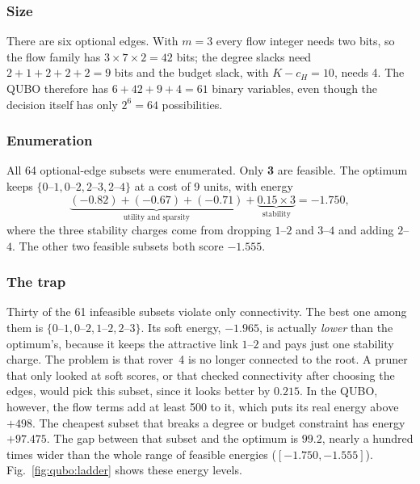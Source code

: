 \subsubsection{Size} There are six optional edges. With $m=3$ every flow
integer needs two bits, so the flow family has $3\times7\times2=42$ bits; the
degree slacks need $2+1+2+2+2=9$ bits and the budget slack, with $K-c_H=10$,
needs 4. The QUBO therefore has $6+42+9+4=61$ binary variables, even though
the decision itself has only $2^6=64$ possibilities.

\subsubsection{Enumeration} All 64 optional-edge subsets were enumerated.
Only \textbf{3} are feasible. The optimum keeps $\{0\text{--}1,0\text{--}2,
2\text{--}3,2\text{--}4\}$ at a cost of 9 units, with energy
\[
\underbrace{(-0.82)+(-0.67)+(-0.71)}_{\text{utility and sparsity}}
+\underbrace{0.15\times3}_{\text{stability}}=-1.750,
\]
where the three stability charges come from dropping $1$--$2$ and $3$--$4$
and adding $2$--$4$. The other two feasible subsets both score $-1.555$.

\subsubsection{The trap} Thirty of the 61 infeasible subsets violate only
connectivity. The best one among them is $\{0\text{--}1,0\text{--}2,
1\text{--}2,2\text{--}3\}$. Its soft energy, $-1.965$, is actually
\emph{lower} than the optimum's, because it keeps the attractive link
$1$--$2$ and pays just one stability charge. The problem is that rover~4 is no
longer connected to the root. A pruner that only looked at soft scores, or
that checked connectivity after choosing the edges, would pick this subset,
since it looks better by $0.215$. In the QUBO, however, the flow terms add at
least 500 to it, which puts its real energy above $+498$. The cheapest subset
that breaks a degree or budget constraint has energy $+97.475$. The gap
between that subset and the optimum is $99.2$, nearly a hundred times wider
than the whole range of feasible energies ($[-1.750,-1.555]$).
Fig.~\ref{fig:qubo:ladder} shows these energy levels.

